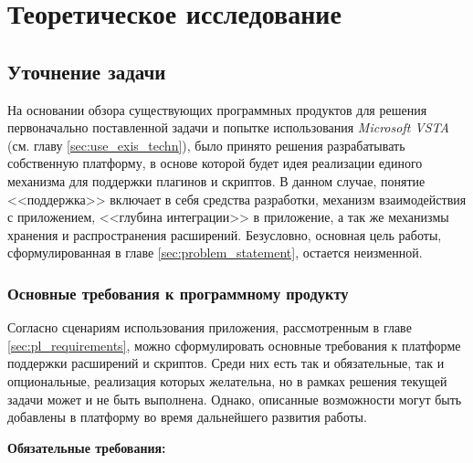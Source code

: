 \section{Теоретическое исследование}





\subsection{Уточнение задачи}

На основании обзора существующих программных продуктов для решения первоначально поставленной задачи и попытке использования {\it Microsoft VSTA}~\cite{vsta-website} (см. главу \ref{sec:use_exis_techn}), было принято решения разрабатывать собственную платформу, в основе которой будет идея реализации единого механизма для поддержки плагинов и скриптов. В данном случае, понятие <<поддержка>> включает в себя средства разработки, механизм взаимодействия с приложением, <<глубина интеграции>> в приложение, а так же механизмы хранения и распространения расширений. Безусловно, основная цель работы, сформулированная в главе \ref{sec:problem_statement}, остается неизменной.

\subsubsection{Основные требования к программному продукту}

Согласно сценариям использования приложения, рассмотренным в главе \ref{sec:pl_requirements}, можно сформулировать основные требования к платформе поддержки расширений и скриптов. Среди них есть так и обязательные, так и опциональные, реализация которых желательна, но в рамках решения текущей задачи может и не быть выполнена. Однако, описанные возможности могут быть добавлены в платформу во время дальнейшего развития работы.

{\bf Обязательные требования:}

